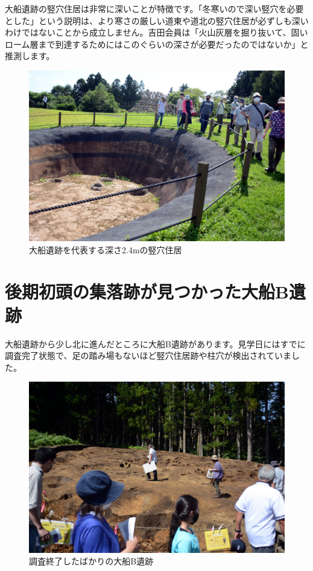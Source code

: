 \documentclass[a4j,11pt,twocolumn,openany]{jsbook}
\begin{document}
大船遺跡の竪穴住居は非常に深いことが特徴です。「冬寒いので深い竪穴を必要とした」という説明は、より寒さの厳しい道東や道北の竪穴住居が必ずしも深いわけではないことから成立しません。吉田会員は「火山灰層を掘り抜いて、固いローム層まで到達するためにはこのぐらいの深さが必要だったのではないか」と推測します。

\begin{figure}[ht]
	\centering
	\includegraphics[width=\linewidth]{fig/01_Iseki_kengaku/08DeepHouse.JPG}
	\caption{大船遺跡を代表する深さ2.4mの竪穴住居}
	\label{}
\end{figure}

\section{後期初頭の集落跡が見つかった大船B遺跡}

大船遺跡から少し北に進んだところに大船B遺跡があります。見学日にはすでに調査完了状態で、足の踏み場もないほど竪穴住居跡や柱穴が検出されていました。

\begin{figure}[ht]
	\centering
	\includegraphics[width=\linewidth]{fig/01_Iseki_kengaku/09_OfuneB_zenkei.JPG}
	\caption{調査終了したばかりの大船B遺跡}
	\label{}
\end{figure}
\end{document}
